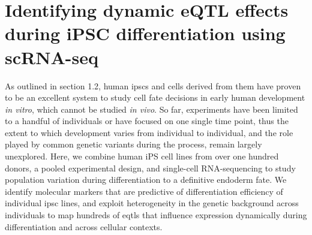 
\chapter{Identifying dynamic eQTL effects during iPSC differentiation using scRNA-seq}
\label{chapter4}

As outlined in section 
1.2, human \glspl{ipsc} and cells derived from them have proven to be an excellent system to study cell fate decisions in early human development \textit{in vitro}, which cannot be studied \textit{in vivo}.
So far, experiments have been limited to a handful of individuals 
or have focused on one single time point,
thus the extent to which development varies from individual to individual, and the role played by common genetic variants during the process, remain largely unexplored.
Here, we combine human iPS cell lines from over one hundred donors, a pooled experimental design, and single-cell RNA-sequencing to study population variation during differentiation to a definitive endoderm fate. 
We identify molecular markers that are predictive of differentiation efficiency of individual \gls{ipsc} lines, and exploit heterogeneity in the genetic background across individuals to map hundreds of \glspl{eqtl} that influence expression dynamically during differentiation and across cellular contexts.\\

\newpage

